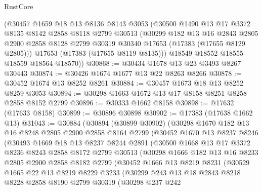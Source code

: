\begin{lexlean}{RustCore}
\begin{coremodule}
      (@30457
        @1659
        @18
        @13
        @8136
        @8143
        @3053
        (@30500
          @1490
          @13
          @17
          @3372
          @8135
          @8142
          @2858
          @8118
          @2799
          @30513
          (@30299
            @182
            @13
            @16
            @2843
            @2805
            @2900
            @2858
            @8128
            @2799
            @30319
            @30340
            @17653
            (@17383 (@17655 @8129 @2805)))
          @17653
          (@17383 (@17655 @8119 @8135)))
        @18549
        @18552
        @18555
        @18559
        @18564
        @18570))
@30868 := @30434 @1678 @13 @23 @3493 @8267 @30443
@30874 := @30426 @1674 @1677 @13 @22 @8263 @8266
@30878 := @30452 @1674 @13 @8252 @8261
@30884 := @30457 @1673 @18 @13 @8252 @8259 @3053
@30894 := @30298 @1663 @1672 @13 @17 @8158 @8251 @8258 @2858 @8152 @2799
@30896 := @30333 @1662 @8158
@30898 := @17632 (@17633 @8158)
@30899 := @30896 @30898
@30902 := @17383 (@17638 @1662 @13)
@31043 := @30884
    (@30894
      (@30899 @30902)
      (@30298
        @1670
        @182
        @13
        @16
        @8248
        @2805
        @2900
        @2858
        @8164
        @2799
        (@30452
          @1670
          @13
          @8237
          @8246
          (@30493
            @1669
            @18
            @13
            @8237
            @8244
            @2891
            (@30500
              @1668
              @13
              @17
              @3372
              @8236
              @8243
              @2858
              @8172
              @2799
              @30513
              (@30298
                @1666
                @182
                @13
                @16
                @8233
                @2805
                @2900
                @2858
                @8182
                @2799
                (@30452
                  @1666
                  @13
                  @8219
                  @8231
                  (@30529
                    @1665
                    @22
                    @13
                    @8219
                    @8229
                    @3233
                    (@30299
                      @243
                      @13
                      @18
                      @2843
                      @8218
                      @8228
                      @2858
                      @8190
                      @2799
                      @30319
                      (@30298
                        @237
                        @242

\end{coremodule}
\end{lexlean}
